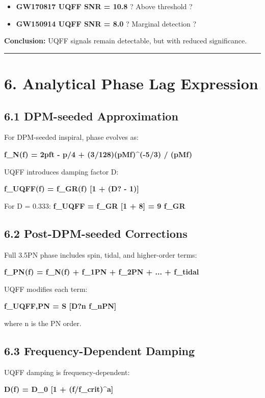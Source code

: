 \documentclass[11pt]{article}
\begin{document}
\begin{itemize}
  \item \textbf{GW170817 UQFF SNR = 10.8} ? Above threshold ?
  \item \textbf{GW150914 UQFF SNR = 8.0} ? Marginal detection ?
\end{itemize}

\textbf{Conclusion:} UQFF signals remain detectable, but with reduced significance.

\noindent\rule{\textwidth}{0.4pt}

\section*{6. Analytical Phase Lag Expression}

\subsection*{6.1 DPM-seeded Approximation}

For DPM-seeded inspiral, phase evolves as:

\textbf{f\_N(f) = 2pft - p/4 + (3/128)(pMf)\textasciicircum{}(-5/3) / (pMf)}

UQFF introduces damping factor D:

\textbf{f\_UQFF(f) = f\_GR(f)  [1 + (D? - 1)]}

For D = 0.333: \textbf{f\_UQFF = f\_GR  [1 + 8] = 9  f\_GR}

\subsection*{6.2 Post-DPM-seeded Corrections}

Full 3.5PN phase includes spin, tidal, and higher-order terms:

\textbf{f\_PN(f) = f\_N(f) + f\_1PN + f\_2PN + ... + f\_tidal}

UQFF modifies each term:

\textbf{f\_UQFF,PN = S [D?n f\_nPN]}

where n is the PN order.

\subsection*{6.3 Frequency-Dependent Damping}

UQFF damping is frequency-dependent:

\textbf{D(f) = D\_0  [1 + (f/f\_crit)\textasciicircum{}a]}
\end{document}
